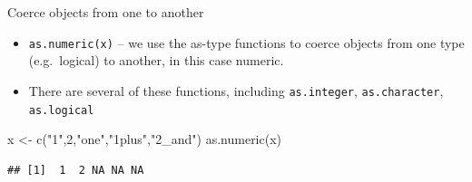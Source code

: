 \documentclass[
  10pt,
  ignorenonframetext,
]{beamer}
\newenvironment{Shaded}{\begin{snugshade}}{\end{snugshade}}
\newcommand{\DecValTok}[1]{\textcolor[rgb]{0.86,0.86,0.80}{#1}}
\newcommand{\KeywordTok}[1]{\textcolor[rgb]{0.94,0.87,0.69}{#1}}
\newcommand{\NormalTok}[1]{\textcolor[rgb]{0.80,0.80,0.80}{#1}}
\newcommand{\StringTok}[1]{\textcolor[rgb]{0.80,0.58,0.58}{#1}}
\providecommand{\tightlist}{%
  \setlength{\itemsep}{0pt}\setlength{\parskip}{0pt}}
\begin{document}
\begin{frame}[fragile]{Coerce objects from one to another}
\protect\hypertarget{coerce-objects-from-one-to-another}{}

\begin{itemize}
\tightlist
\item
  \texttt{as.numeric(x)} -- we use the as-type functions to coerce
  objects from one type (e.g.~logical) to another, in this case numeric.
\item
  There are several of these functions, including \texttt{as.integer},
  \texttt{as.character}, \texttt{as.logical} 
\end{itemize}

\begin{Shaded}
\begin{Highlighting}[]
\NormalTok{x <-}\StringTok{ }\KeywordTok{c}\NormalTok{(}\StringTok{"1"}\NormalTok{,}\DecValTok{2}\NormalTok{,}\StringTok{"one"}\NormalTok{,}\StringTok{"1plus"}\NormalTok{,}\StringTok{"2_and"}\NormalTok{)}
\KeywordTok{as.numeric}\NormalTok{(x)}
\end{Highlighting}
\end{Shaded}

\begin{verbatim}
## [1]  1  2 NA NA NA
\end{verbatim}

\end{frame}
\end{document}
